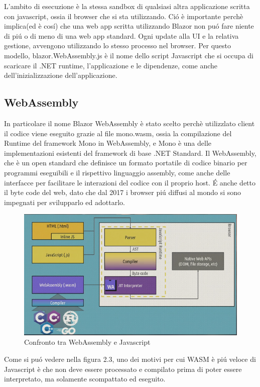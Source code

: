 L'ambito di esecuzione \`e la stessa sandbox di qualsiasi altra applicazione scritta con javascript, ossia il browser che si sta utilizzando.
Ci\'o \`e importante perch\`e implica(ed \`e cos\'i) che una web app scritta utilizzando Blazor non pu\'o fare niente di pi\'u o di meno di una web app standard.
Ogni update alla UI e la relativa gestione, avvengono utilizzando lo stesso processo nel browser.
Per questo modello, blazor.WebAssembly.js \`e il nome dello script Javascript che si occupa di scaricare il .NET runtime, l'applicazione e le dipendenze, come anche dell'inizializzazione dell'applicazione.

\subsection{WebAssembly}\label{sez:webAssembly}
In particolare il nome Blazor WebAssembly \`e stato scelto perch\`e utilizzlato client il codice viene eseguito grazie al file mono.wasm, ossia la compilazione del Runtime del framework Mono in WebAssembly, e Mono \`e una delle implementazioni esistenti del framework di base .NET Standard.
Il WebAssembly, che \`e un open standard che definisce un formato portatile di codice binario per programmi eseguibili e il rispettivo linguaggio assembly, come anche delle interfacce per facilitare le interazioni del codice con il proprio host.
\'E anche detto il byte code del web, dato che dal 2017 i browser pi\'u diffusi al mondo si sono impegnati per svilupparlo ed adottarlo.\cite{webAssemblySupport}

\begin{figure}[H]
	\centerline{\includegraphics[scale=0.7]{figure/WasmVSJavascript.PNG}}
	\caption{Confronto tra WebAssembly e Javascript}
	\label{fig:WasmVSJavascript}
\end{figure}
Come si pu\'o vedere nella figura 2.3, uno dei motivi per cui WASM \`e pi\'u veloce di Javascript \`e che non deve essere processato e compilato prima di poter essere interpretato, ma solamente scompattato ed eseguito.

